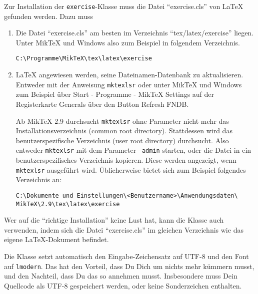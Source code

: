\documentclass{exercise}
\begin{document}
    Zur Installation der \texttt{exercise}-Klasse muss die Datei
    \enquote{exercise.cls} von \LaTeX{} gefunden werden. Dazu muss
    \begin{enumerate}[1)]
      \item Die Datei \enquote{exercise.cls} am besten im Verzeichnis
        \enquote{tex/latex/exercise}
        liegen. Unter MikTeX und Windows also zum Beispiel in folgendem Verzeichnis.
        
        \texttt{C:\textbackslash{}Programme\textbackslash{}MikTeX\textbackslash{}tex\textbackslash{}latex\textbackslash{}exercise}
      
      \item \LaTeX{} angewiesen werden, seine Dateinamen-Datenbank zu aktualisieren.
        Entweder mit der Anweisung \texttt{mktexlsr} oder unter MikTeX und Windows
        zum Beispiel über \textsf{Start - Programme - MikTeX Settings} auf der
        Registerkarte \textsf{Generals} über den Button \textsf{Refresh FNDB}.
        
      Ab MikTeX 2.9 durchsucht \texttt{mktexlsr} ohne Parameter nicht mehr das
      Installationsverzeichnis (common root directory). Stattdessen wird
      das benutzerspezifische Verzeichnis (user root directory) durchsucht. Also
      entweder \texttt{mktexlsr} mit dem Parameter \texttt{--admin} starten,
      oder die Datei in ein benutzerspezifisches Verzeichnis kopieren. Diese
      werden angezeigt, wenn \texttt{mktexlsr} ausgeführt wird. Üblicherweise
      bietet sich zum Beispiel folgendes Verzeichnis an:
      
      \texttt{C:\textbackslash{}Dokumente und Einstellungen\textbackslash{}<Benutzername>\textbackslash{}Anwendungsdaten\textbackslash{}\\
      MikTeX\textbackslash{}2.9\textbackslash{}tex\textbackslash{}latex\textbackslash{}exercise}
       
    \end{enumerate}
    
    Wer auf die \enquote{richtige Installation} keine Lust hat, kann die Klasse
    auch verwenden, indem sich die Datei \enquote{exercise.cls} im gleichen
    Verzeichnis wie das eigene \LaTeX{}-Dokument befindet.
    
    Die Klasse setzt automatisch den Eingabe-Zeichensatz auf UTF-8 und den Font
    auf \texttt{lmodern}. Das hat den Vorteil, dass Du Dich um nichts mehr
    kümmern musst, und den Nachteil, dass Du das so annehmen musst. Insbesondere
    muss Dein Quellcode als UTF-8 gespeichert werden, oder keine
    Sonderzeichen enthalten.
    
\end{document}
